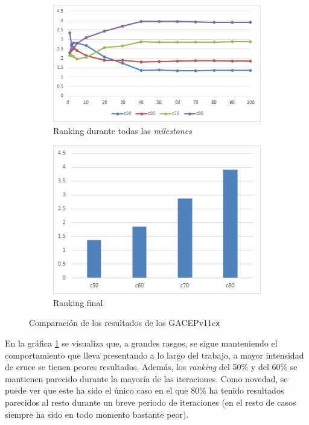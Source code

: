 \begin{figure}[h]
     \centering
     \begin{subfigure}[b]{0.45\textwidth}
         \centering
         \includegraphics[width=\textwidth]{imagenes/Experimental/GACEPv356.png}
         \caption{Ranking durante todas las \textit{milestones}}
         \label{fig:GACEPv356_lineas}
     \end{subfigure}
     \hfill
     \begin{subfigure}[b]{0.45\textwidth}
         \centering
         \includegraphics[width=\textwidth]{imagenes/Experimental/barras/GACEPv356.png}
         \caption{Ranking final}
         \label{fig:GACEPv356_barras}
     \end{subfigure}
        \caption{Comparación de los resultados de los GACEPv11c\texttt{x}}
        \label{fig:GACEPv356}
\end{figure}

En la gráfica \ref{fig:GACEPv356_lineas} se visualiza que, a grandes rasgos, se sigue manteniendo el comportamiento que lleva presentando a lo largo del trabajo, a mayor intensidad de cruce se tienen peores resultados. 
Además, los \textit{ranking} del 50\% y del 60\% se mantienen parecido durante la mayoría de las iteraciones. 
Como novedad, se puede ver que este ha sido el único caso en el que 80\% ha tenido resultados parecidos al resto durante un breve periodo de iteraciones (en el resto de casos siempre ha sido en todo momento bastante peor).

